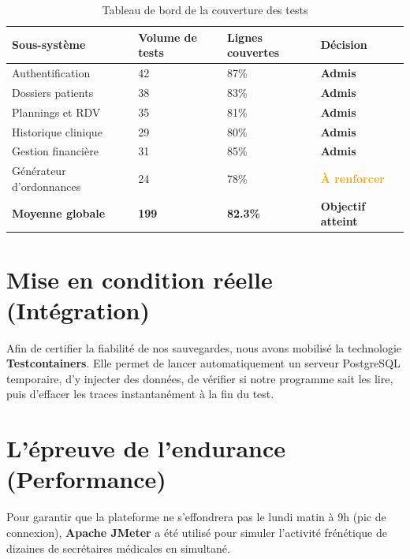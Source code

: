 \documentclass[final]{report}
\begin{document}
\begin{table}[H]
\centering
\caption{Tableau de bord de la couverture des tests}
\renewcommand{\arraystretch}{1.4}
\begin{tabularx}{\textwidth}{|X|p{2.5cm}|p{2.5cm}|p{2cm}|}
\hline
\textbf{Sous-système} & \textbf{Volume de tests} & \textbf{Lignes couvertes} & \textbf{Décision} \\
\hline
Authentification & 42 & 87\% & \textcolor{codegreen}{\textbf{Admis}} \\
\hline
Dossiers patients & 38 & 83\% & \textcolor{codegreen}{\textbf{Admis}} \\
\hline
Plannings et RDV & 35 & 81\% & \textcolor{codegreen}{\textbf{Admis}} \\
\hline
Historique clinique & 29 & 80\% & \textcolor{codegreen}{\textbf{Admis}} \\
\hline
Gestion financière & 31 & 85\% & \textcolor{codegreen}{\textbf{Admis}} \\
\hline
Générateur d'ordonnances & 24 & 78\% & \textcolor{orange}{\textbf{À renforcer}} \\
\hline
\textbf{Moyenne globale} & \textbf{199} & \textbf{82.3\%} & \textcolor{codegreen}{\textbf{Objectif atteint}} \\
\hline
\end{tabularx}
\end{table}
 
\section{Mise en condition réelle (Intégration)}
Afin de certifier la fiabilité de nos sauvegardes, nous avons mobilisé la technologie \textbf{Testcontainers}. Elle permet de lancer automatiquement un serveur PostgreSQL temporaire, d'y injecter des données, de vérifier si notre programme sait les lire, puis d'effacer les traces instantanément à la fin du test.
 
\section{L'épreuve de l'endurance (Performance)}
Pour garantir que la plateforme ne s'effondrera pas le lundi matin à 9h (pic de connexion), \textbf{Apache JMeter} a été utilisé pour simuler l'activité frénétique de dizaines de secrétaires médicales en simultané.
 
\end{document}
